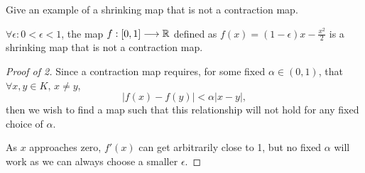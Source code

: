 \documentclass[../9extra]{subfiles}
\begin{document}
\begin{problem}[2]
Give an example of a shrinking map that is not a contraction map.
\end{problem}
\begin{proposition}[2]
	$\forall \epsilon : 0<\epsilon<1$, the map $ f:[0,1]\longrightarrow \mathbb{R}$ defined as $f(x)=(1-\epsilon)x - \frac{x^2}{2}$ is a shrinking map that is not a contraction map.
\end{proposition}
\begin{proof}[Proof of 2]
	Since a contraction map requires, for some fixed $\alpha \in (0,1)$, that $\forall x,y \in K,\, x \neq y$, \[
		|f(x)-f(y)| < \alpha|x-y|
		,\]
	then we wish to find a map such that this relationship will not hold for any fixed choice of $\alpha$.

	As $x$ approaches zero,  $f'(x)$ can get arbitrarily close to 1, but no fixed  $\alpha$ will work as we can always choose a smaller  $\epsilon$.
\end{proof}
\end{document}
